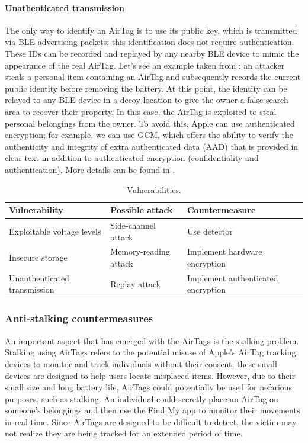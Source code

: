 \documentclass[english]{article}
\begin{document}
\paragraph{Unathenticated transmission}The only way to identify an AirTag is to use its public key, which is transmitted via BLE advertising packets; this identification does not require authentication. These IDs can be recorded and replayed by any nearby BLE device to mimic the appearance of the real AirTag. Let's see an example taken from \cite{reverse}: an attacker steals a personal item containing an AirTag and subsequently records the current public identity before removing the battery. At this point, the identity can be relayed to any BLE device in a decoy location to give the owner a false search area to recover their property. In this case, the AirTag is exploited to steal personal belongings from the owner. To avoid this, Apple can use authenticated encryption; for example, we can use GCM, which offers the ability to verify the authenticity and integrity of extra authenticated data (AAD) that is provided in clear text in addition to authenticated encryption (confidentiality and authentication). More details can be found in \cite{gcm}.

\begin{table}[h] 
  \caption{Vulnerabilities.}
  \centering
  \begin{tabularx}{\textwidth}{|X|X|X|}
    \hline
    \textbf{Vulnerability}      & \textbf{Possible attack} & \textbf{Countermeasure}             \\ \hline
    Exploitable voltage levels  & Side-channel attack      & Use detector         \\ \hline
    Insecure storage            & Memory-reading attack    & Implement hardware encryption \\ \hline
    Unauthenticated transmission & Replay attack            & Implement authenticated encryption                     \\ \hline
  \end{tabularx}
  \label{vuln}
\end{table}

\subsubsection{Anti-stalking countermeasures}\label{countermeasures}
An important aspect that has emerged with the AirTags is the stalking problem. Stalking using AirTags refers to the potential misuse of Apple's AirTag tracking devices to monitor and track individuals without their consent; these small devices are designed to help users locate misplaced items. However, due to their small size and long battery life, AirTags could potentially be used for nefarious purposes, such as stalking. An individual could secretly place an AirTag on someone's belongings and then use the Find My app to monitor their movements in real-time. Since AirTags are designed to be difficult to detect, the victim may not realize they are being tracked for an extended period of time.
\end{document}
